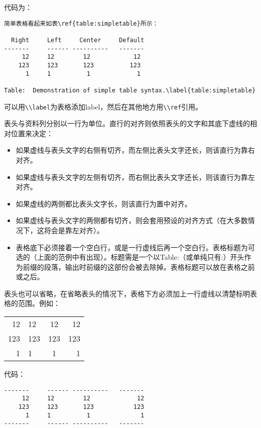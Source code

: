 \documentclass[cn]{elegantbook}
\providecommand{\tightlist}{%
  \setlength{\itemsep}{0pt}\setlength{\parskip}{0pt}}
\newcommand{\passthrough}[1]{#1}
\begin{document}
代码为：

\begin{lstlisting}
简单表格看起来如表\ref{table:simpletable}所示：

  Right     Left     Center     Default
-------     ------ ----------   -------
     12     12        12            12
    123     123       123          123
      1     1          1             1

Table:  Demonstration of simple table syntax.\label{table:simpletable}
\end{lstlisting}

可以用\passthrough{\lstinline!\\label!}为表格添加label，然后在其他地方用\passthrough{\lstinline!\\ref!}引用。

表头与资料列分别以一行为单位。直行的对齐则依照表头的文字和其底下虚线的相对位置来决定：

\begin{itemize}
\tightlist
\item
  如果虚线与表头文字的右侧有切齐，而左侧比表头文字还长，则该直行为靠右对齐。
\item
  如果虚线与表头文字的左侧有切齐，而右侧比表头文字还长，则该直行为靠左对齐。
\item
  如果虚线的两侧都比表头文字长，则该直行为置中对齐。
\item
  如果虚线与表头文字的两侧都有切齐，则会套用预设的对齐方式（在大多数情况下，这将会是靠左对齐）。
\item
  表格底下必须接着一个空白行，或是一行虚线后再一个空白行。表格标题为可选的（上面的范例中有出现）。标题需是一个以Table:（或单纯只有:）开头作为前缀的段落，输出时前缀的这部份会被去除掉。表格标题可以放在表格之前或之后。
\end{itemize}

表头也可以省略，在省略表头的情况下，表格下方必须加上一行虚线以清楚标明表格的范围。例如：

\begin{longtable}[]{@{}rlcr@{}}
\toprule
\endhead
12 & 12 & 12 & 12\tabularnewline
123 & 123 & 123 & 123\tabularnewline
1 & 1 & 1 & 1\tabularnewline
\bottomrule
\end{longtable}

代码：

\begin{lstlisting}
-------     ------ ----------   -------
     12     12        12             12
    123     123       123           123
      1     1          1              1
-------     ------ ----------   -------
\end{lstlisting}
\end{document}
